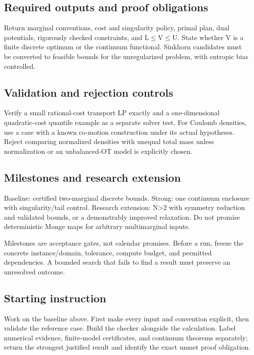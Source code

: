 \documentclass[
  11pt,
]{article}
\begin{document}
\subsection{Required outputs and proof obligations}

Return marginal conventions, cost and singularity policy, primal plan,
dual potentials, rigorously checked constraints, and
L\ensuremath{\le}V\ensuremath{\le}U. State whether V is a finite
discrete optimum or the continuum functional. Sinkhorn candidates must
be converted to feasible bounds for the unregularized problem, with
entropic bias controlled.

\subsection{Validation and rejection controls}

Verify a small rational-cost transport LP exactly and a one-dimensional
quadratic-cost quantile example as a separate solver test. For Coulomb
densities, use a case with a known co-motion construction under its
actual hypotheses. Reject comparing normalized densities with unequal
total mass unless normalization or an unbalanced-OT model is explicitly
chosen.

\subsection{Milestones and research extension}

Baseline: certified two-marginal discrete bounds. Strong: one continuum
enclosure with singularity/tail control. Research extension:
N\textgreater2 with symmetry reduction and validated bounds, or a
demonstrably improved relaxation. Do not promise deterministic Monge
maps for arbitrary multimarginal inputs.

Milestones are acceptance gates, not calendar promises. Before a run,
freeze the concrete instance/domain, tolerance, compute budget, and
permitted dependencies. A bounded search that fails to find a result
must preserve an unresolved outcome.

\subsection{Starting instruction}

Work on the baseline above. First make every input and convention
explicit, then validate the reference case. Build the checker alongside
the calculation. Label numerical evidence, finite-model certificates,
and continuum theorems separately; return the strongest justified result
and identify the exact unmet proof obligation.
\end{document}
